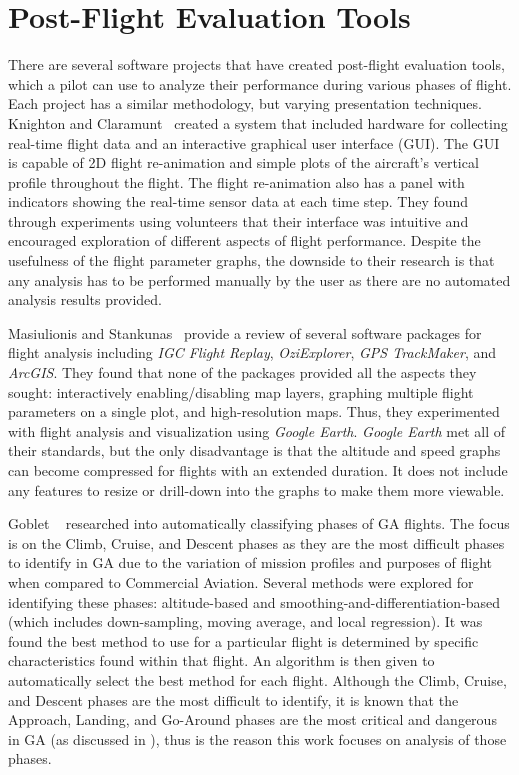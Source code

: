 \section{Post-Flight Evaluation Tools}

	There are several software projects that have created post-flight evaluation tools, which a pilot can use to analyze their performance during various phases of flight.  Each project has a similar methodology, but varying presentation techniques.  Knighton and Claramunt~\cite{knighton2001an-aeronautical} created a system that included hardware for collecting real-time flight data and an interactive graphical user interface (GUI).  The GUI is capable of 2D flight re-animation and simple plots of the aircraft's vertical profile throughout the flight.  The flight re-animation also has a panel with indicators showing the real-time sensor data at each time step.  They found through experiments using volunteers that their interface was intuitive and encouraged exploration of different aspects of flight performance.  Despite the usefulness of the flight parameter graphs, the downside to their research is that any analysis has to be performed manually by the user as there are no automated analysis results provided.
    
    Masiulionis and Stankunas~\cite{masiulionis2017review} provide a review of several software packages for flight analysis including \textit{IGC Flight Replay}, \textit{OziExplorer}, \textit{GPS TrackMaker}, and \textit{ArcGIS}.  They found that none of the packages provided all the aspects they sought:  interactively enabling/disabling map layers, graphing multiple flight parameters on a single plot, and high-resolution maps.  Thus, they experimented with flight analysis and visualization using \textit{Google Earth}.  \textit{Google Earth} met all of their standards, but the only disadvantage is that the altitude and speed graphs can become compressed for flights with an extended duration.  It does not include any features to resize or drill-down into the graphs to make them more viewable. 
    
    Goblet \etal~\cite{goblet2016phase,goblet2015identifying} researched into automatically classifying phases of GA flights.  The focus is on the Climb, Cruise, and Descent phases as they are the most difficult phases to identify in GA due to the variation of mission profiles and purposes of flight when compared to Commercial Aviation. Several methods were explored for identifying these phases:  altitude-based and smoothing-and-differentiation-based (which includes down-sampling, moving average, and local regression).  It was found the best method to use for a particular flight is determined by specific characteristics found within that flight.  An algorithm is then given to automatically select the best method for each flight.  Although the Climb, Cruise, and Descent phases are the most difficult to identify, it is known that the Approach, Landing, and Go-Around phases are the most critical and dangerous in GA (as discussed in ), thus is the reason this work focuses on analysis of those phases. 
    
